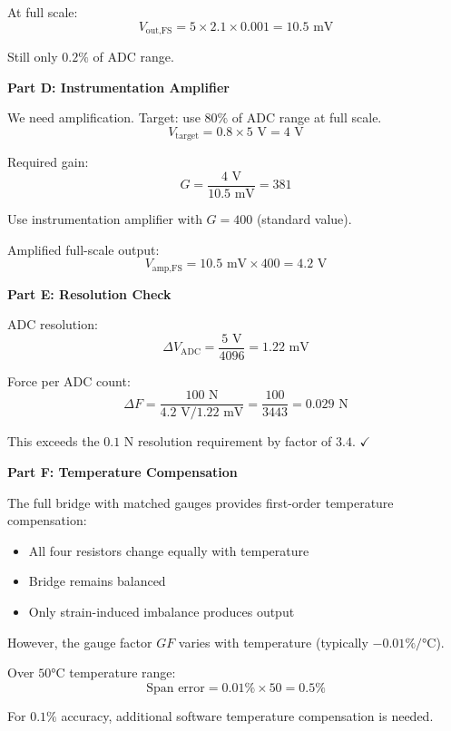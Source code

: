 \begin{example}
At full scale:
\begin{equation}
V_{\text{out,FS}} = 5 \times 2.1 \times 0.001 = 10.5\text{ mV}
\end{equation}

Still only $0.2\%$ of ADC range.

\textbf{Part D: Instrumentation Amplifier}

We need amplification. Target: use $80\%$ of ADC range at full scale.
\begin{equation}
V_{\text{target}} = 0.8 \times 5\text{ V} = 4\text{ V}
\end{equation}

Required gain:
\begin{equation}
G = \frac{4\text{ V}}{10.5\text{ mV}} = 381
\end{equation}

Use instrumentation amplifier with $G = 400$ (standard value).

Amplified full-scale output:
\begin{equation}
V_{\text{amp,FS}} = 10.5\text{ mV} \times 400 = 4.2\text{ V}
\end{equation}

\textbf{Part E: Resolution Check}

ADC resolution:
\begin{equation}
\Delta V_{\text{ADC}} = \frac{5\text{ V}}{4096} = 1.22\text{ mV}
\end{equation}

Force per ADC count:
\begin{equation}
\Delta F = \frac{100\text{ N}}{4.2\text{ V}/1.22\text{ mV}} = \frac{100}{3443} = 0.029\text{ N}
\end{equation}

This exceeds the $0.1\text{ N}$ resolution requirement by factor of $3.4$. $\checkmark$

\textbf{Part F: Temperature Compensation}

The full bridge with matched gauges provides first-order temperature compensation:
\begin{itemize}
    \item All four resistors change equally with temperature
    \item Bridge remains balanced
    \item Only strain-induced imbalance produces output
\end{itemize}

However, the gauge factor $GF$ varies with temperature (typically $-0.01\%/°\text{C}$).

Over $50°\text{C}$ temperature range:
\begin{equation}
\text{Span error} = 0.01\% \times 50 = 0.5\%
\end{equation}

For $0.1\%$ accuracy, additional software temperature compensation is needed.
\end{example}

